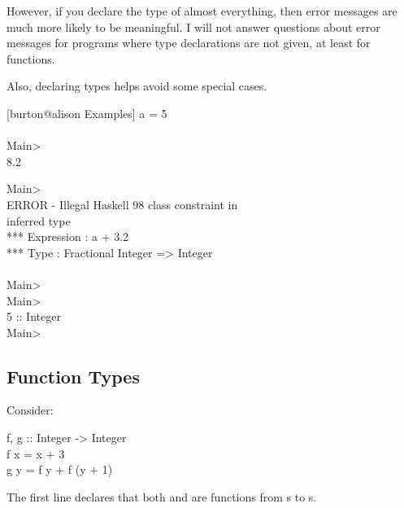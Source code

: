 \documentclass{seminar}
\begin{document}
\begin{slide}
However, if you declare the type of almost everything,
then error messages are much more likely to be meaningful.
I will not answer questions about error messages for
programs where type declarations are not given, at least
for functions.

Also, declaring types helps avoid some special cases.

\newslide

\begin{code}[SystemColor]

[burton@alison Examples]%
a = 5\\
[burton@alison Examples]%
\color{red}{\LARGE ...}\\

Main> \\
8.2
\end{code}

\newslide

\begin{code}[SystemColor]
Main> \\
ERROR - Illegal Haskell 98 class constraint in \\
inferred type \\
*** Expression : a + 3.2\\
*** Type       : Fractional Integer => Integer\\
\\
Main> \\
Main> \\
5 :: Integer\\
Main> 
\end{code}

\newslide

\subsection*{Function Types}

Consider:

\begin{code}
f, g :: Integer -> Integer\\
f x = x + 3\\
g y = f y + f (y + 1)
\end{code}

The first line declares that both 
and  are functions from s
to s.


\end{slide}
\end{document}
